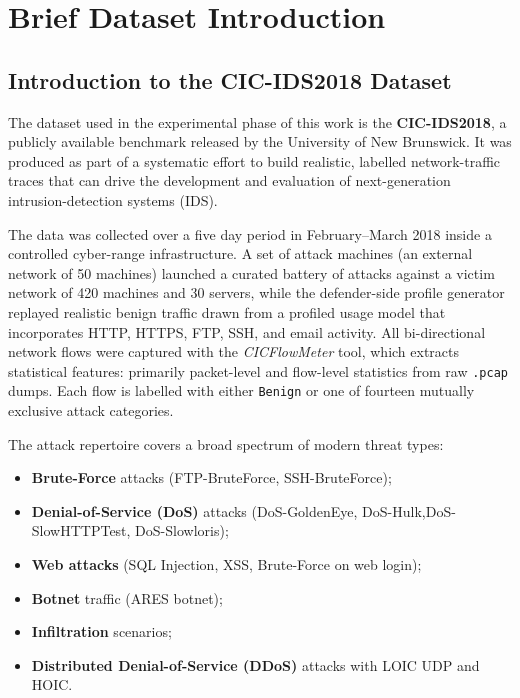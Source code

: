 \documentclass[../main.tex]{subfiles}
\begin{document}
\chapter{Brief Dataset Introduction}
\label{chap:dataset}


\section{Introduction to the CIC-IDS2018 Dataset}
\label{sec:dataset-intro}

The dataset used in the experimental phase of this work is the \textbf{CIC-IDS2018}, a publicly available benchmark released by the University of New Brunswick.  It was produced as part of a systematic effort to build realistic, labelled network-traffic traces that can drive the development and evaluation of next-generation intrusion-detection systems (IDS).

The data was collected over a five day period in February–March 2018 inside a controlled cyber-range infrastructure.  A set of attack machines (an external network of 50 machines) launched a curated battery of attacks against a victim network of 420 machines and 30 servers, while the defender-side profile generator replayed realistic benign traffic drawn from a profiled usage model that incorporates HTTP, HTTPS, FTP, SSH, and email activity. All bi-directional network flows were captured with the \textit{CIC\-Flow\-Meter} tool\supercite{cicflowmeter}, which extracts statistical features: primarily packet-level and flow-level statistics from raw \texttt{.pcap} dumps. Each flow is labelled with either \texttt{Benign} or one of fourteen mutually exclusive attack categories.

The attack repertoire covers a broad spectrum of modern threat types:
\begin{itemize}
    \item \textbf{Brute-Force} attacks (FTP-BruteForce, SSH-BruteForce);
    \item \textbf{Denial-of-Service (DoS)} attacks (DoS-GoldenEye, DoS-Hulk,\newline DoS-SlowHTTPTest, DoS-Slowloris);
    \item \textbf{Web attacks} (SQL Injection, XSS, Brute-Force on web login);
    \item \textbf{Botnet} traffic (ARES botnet);
    \item \textbf{Infiltration} scenarios;
    \item \textbf{Distributed Denial-of-Service (DDoS)} attacks with LOIC UDP and HOIC.
\end{itemize}
\end{document}
